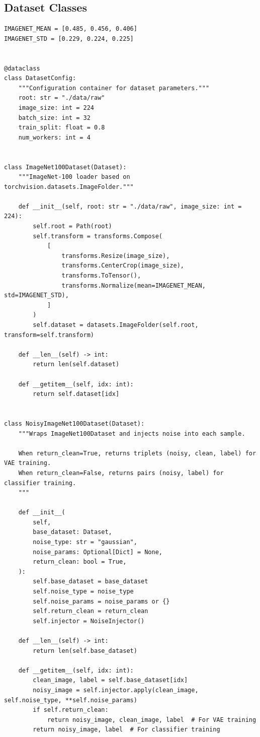 \documentclass[11pt,a4paper]{article}
\begin{document}
\subsection{Dataset Classes}

\begin{lstlisting}[caption={src/dataset.py - Dataset Classes}, label={lst:datasets}]
IMAGENET_MEAN = [0.485, 0.456, 0.406]
IMAGENET_STD = [0.229, 0.224, 0.225]


@dataclass
class DatasetConfig:
    """Configuration container for dataset parameters."""
    root: str = "./data/raw"
    image_size: int = 224
    batch_size: int = 32
    train_split: float = 0.8
    num_workers: int = 4


class ImageNet100Dataset(Dataset):
    """ImageNet-100 loader based on torchvision.datasets.ImageFolder."""

    def __init__(self, root: str = "./data/raw", image_size: int = 224):
        self.root = Path(root)
        self.transform = transforms.Compose(
            [
                transforms.Resize(image_size),
                transforms.CenterCrop(image_size),
                transforms.ToTensor(),
                transforms.Normalize(mean=IMAGENET_MEAN, std=IMAGENET_STD),
            ]
        )
        self.dataset = datasets.ImageFolder(self.root, transform=self.transform)

    def __len__(self) -> int:
        return len(self.dataset)

    def __getitem__(self, idx: int):
        return self.dataset[idx]


class NoisyImageNet100Dataset(Dataset):
    """Wraps ImageNet100Dataset and injects noise into each sample.

    When return_clean=True, returns triplets (noisy, clean, label) for VAE training.
    When return_clean=False, returns pairs (noisy, label) for classifier training.
    """

    def __init__(
        self,
        base_dataset: Dataset,
        noise_type: str = "gaussian",
        noise_params: Optional[Dict] = None,
        return_clean: bool = True,
    ):
        self.base_dataset = base_dataset
        self.noise_type = noise_type
        self.noise_params = noise_params or {}
        self.return_clean = return_clean
        self.injector = NoiseInjector()

    def __len__(self) -> int:
        return len(self.base_dataset)

    def __getitem__(self, idx: int):
        clean_image, label = self.base_dataset[idx]
        noisy_image = self.injector.apply(clean_image, self.noise_type, **self.noise_params)
        if self.return_clean:
            return noisy_image, clean_image, label  # For VAE training
        return noisy_image, label  # For classifier training
\end{lstlisting}
\end{document}
